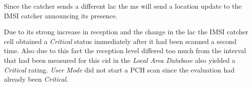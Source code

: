 Since the catcher sends a different \gls{lac} the \gls{ms} will send a location update to the IMSI catcher announcing its presence.

Due to its strong increase in reception and the change in the \gls{lac} the IMSI catcher cell obtained a \emph{Critical} status immediately after it had been scanned a second time.
Also due to this fact the reception level differed too much from the interval that had been measured for this \gls{cid}  in the \emph{Local Area Database} also yielded a \emph{Critical} rating.
\emph{User Mode} did not start a PCH scan since the evaluation had already been \emph{Critical}.